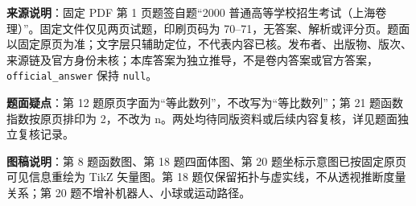 

\begin{gktip}
\textbf{来源说明}：固定 PDF 第 1 页题签自题“2000 普通高等学校招生考试（上海卷理）”。固定文件仅见两页试题，印刷页码为 70–71，无答案、解析或评分页。题面以固定原页为准；文字层只辅助定位，不代表内容已核。发布者、出版物、版次、来源链及官方身份未核；本库答案为独立推导，不是卷内答案或官方答案，\texttt{official_answer} 保持 \texttt{null}。

\textbf{题面疑点}：第 12 题原页字面为“等此数列”，不改写为“等比数列”；第 21 题函数指数按原页排印为 2，不改为 n。两处均待同版资料或后续内容复核，详见题面独立复核记录。

\textbf{图稿说明}：第 8 题函数图、第 18 题四面体图、第 20 题坐标示意图已按固定原页可见信息重绘为 TikZ 矢量图。第 18 题仅保留拓扑与虚实线，不从透视推断度量关系；第 20 题不增补机器人、小球或运动路径。
\end{gktip}


